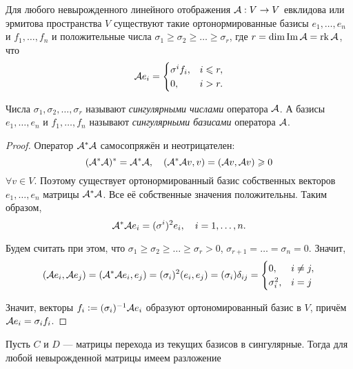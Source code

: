 \begin{theorem}
    Для любого невырожденного линейного отображения $\mathcal{A}: V \to V$ евклидова или эрмитова пространства $V$ существуют такие ортонормированные базисы $e_1, \ldots, e_n$ и $f_1, \ldots, f_n$ и положительные числа $\sigma_1 \geqslant \sigma_2 \geqslant \ldots \geqslant \sigma_r$, где $r = \dim\operatorname{Im}\mathcal{A} = \operatorname{rk}\mathcal{A}$, что
    \[
        \mathcal{A} e_i =
        \begin{cases}
            \sigma^if_i,& i \leqslant r,\\
            0,& i > r.
        \end{cases}
    \]

    Числа $\sigma_1, \sigma_2, \ldots, \sigma_r$ называют \textit{сингулярными числами} оператора $\mathcal{A}$. А базисы $e_1, \ldots, e_n$ и $f_1, \ldots, f_n$ называют \textit{сингулярными базисами} оператора $\mathcal{A}$.
\end{theorem}

\begin{proof}
    Оператор $\mathcal{A}^\ast\mathcal{A}$ самосопряжён и неотрицателен:
    \[
        (\mathcal{A}^\ast\mathcal{A})^\ast = \mathcal{A}^\ast\mathcal{A},\quad(\mathcal{A}^\ast\mathcal{A} v, v) = (\mathcal{A} v, \mathcal{A} v) \geqslant 0
    \]
    $\forall v \in V$. Поэтому существует ортонормированный базис собственных векторов $e_1, \ldots, e_n$ матрицы $\mathcal{A}^\ast\mathcal{A}$. Все её собственные значения положительны. Таким образом,
    \[
        \mathcal{A}^\ast\mathcal{A} e_i = (\sigma^i)^2e_i,\quad i = 1, \ldots, n.
    \]

    Будем считать при этом, что $\sigma_1 \geqslant \sigma_2 \geqslant \ldots \geqslant \sigma_r > 0$, $\sigma_{r + 1} = \ldots = \sigma_n = 0$. Значит,
    \[
        (\mathcal{A} e_i, \mathcal{A} e_j) = (\mathcal{A}^\ast\mathcal{A} e_i, e_j) = (\sigma_i)^2(e_i, e_j) = (\sigma_i)\delta_{ij} =
        \begin{cases}
            0,& i \ne j,\\
            \sigma_i^2,& i = j
        \end{cases}
    \]

    Значит, векторы $f_i \vcentcolon = (\sigma_i)^{-1}\mathcal{A} e_i$ образуют ортономированный базис в $V$, причём $\mathcal{A} e_i = \sigma_if_i$.
\end{proof}

Пусть $C$ и $D$ --- матрицы перехода из текущих базисов в сингулярные. Тогда для любой невырожденной матрицы имеем разложение

